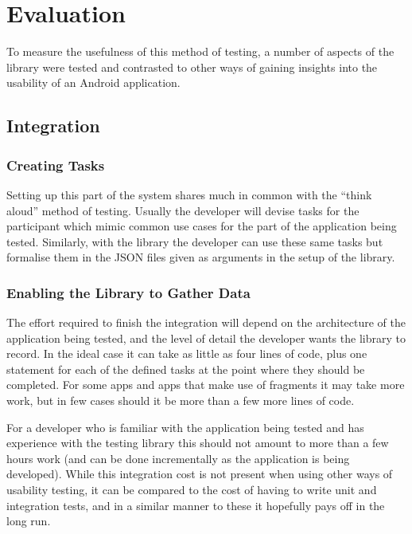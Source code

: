 \chapter{Evaluation}

To measure the usefulness of this method of testing, a number of aspects of the library were tested and contrasted to other ways of gaining insights into the usability of an Android application.

\section{Integration}

\subsection{Creating Tasks}

Setting up this part of the system shares much in common with the ``think aloud'' method of testing.
Usually the developer will devise tasks for the participant which mimic common use cases for the part of the application being tested. Similarly, with the library the developer can use these same tasks but formalise them in the JSON files given as arguments in the setup of the library.

\subsection{Enabling the Library to Gather Data}

The effort required to finish the integration will depend on the architecture of the application being tested, and the level of detail the developer wants the library to record. In the ideal case it can take as little as four  lines of code, plus one statement for each of the defined tasks at the point where they should be completed. For some apps and apps that make use of fragments it may take more work, but in few cases should it be more than a few more lines of code.

For a developer who is familiar with the application being tested and has experience with the testing library this should not amount to more than a few hours work (and can be done incrementally as the application is being developed). While this integration cost is not present when using other ways of usability testing, it can be compared to the cost of having to write unit and integration tests, and in a similar manner to these it hopefully pays off in the long run.


